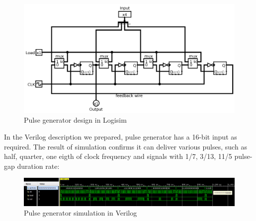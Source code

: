 \documentclass{article}
\begin{document}
	\begin{figure}[h]
		\centering
		\includegraphics[width=1\textwidth]{pwm.png}
		\caption{Pulse generator design in Logisim}
		\centering
	\end{figure}	
	
	In the Verilog description we prepared, pulse generator has a 16-bit input as required. The result of simulation confirms it can deliver various pulses, such as half, quarter, one eigth of clock frequency and signals with 1/7, 3/13, 11/5 pulse-gap duration rate: \\
	
	\begin{figure}[h]
		\centering
		\includegraphics[width=1\textwidth]{part7.png}
		\caption{Pulse generator simulation in Verilog}
		\centering
	\end{figure}	
	
\end{document}
